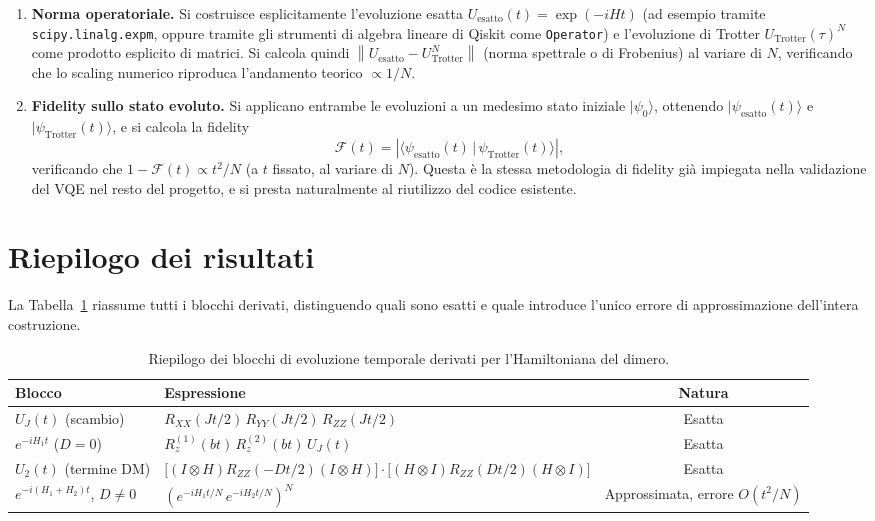 \documentclass[11pt,a4paper]{article}
\newcommand{\ket}[1]{\lvert #1 \rangle}
\begin{document}
\begin{enumerate}
\item \textbf{Norma operatoriale.} Si costruisce esplicitamente l'evoluzione esatta $U_{\text{esatto}}(t)=\exp(-iHt)$ (ad esempio tramite \texttt{scipy.linalg.expm}, oppure tramite gli strumenti di algebra lineare di Qiskit come \texttt{Operator}) e l'evoluzione di Trotter $U_{\text{Trotter}}(\tau)^N$ come prodotto esplicito di matrici. Si calcola quindi $\left\|U_{\text{esatto}}-U_{\text{Trotter}}^N\right\|$ (norma spettrale o di Frobenius) al variare di $N$, verificando che lo scaling numerico riproduca l'andamento teorico $\propto 1/N$.
\item \textbf{Fidelity sullo stato evoluto.} Si applicano entrambe le evoluzioni a un medesimo stato iniziale $\ket{\psi_0}$, ottenendo $\ket{\psi_{\text{esatto}}(t)}$ e $\ket{\psi_{\text{Trotter}}(t)}$, e si calcola la fidelity
\begin{equation}
\mathcal F(t) = \left|\langle \psi_{\text{esatto}}(t) \,|\, \psi_{\text{Trotter}}(t) \rangle\right|,
\end{equation}
verificando che $1-\mathcal F(t) \propto t^2/N$ (a $t$ fissato, al variare di $N$). Questa è la stessa metodologia di fidelity già impiegata nella validazione del VQE nel resto del progetto, e si presta naturalmente al riutilizzo del codice esistente.
\end{enumerate}

\section{Riepilogo dei risultati}

La Tabella~\ref{tab:riepilogo} riassume tutti i blocchi derivati, distinguendo quali sono esatti e quale introduce l'unico errore di approssimazione dell'intera costruzione.

\begin{table}[h]
\centering
\begin{tabular}{@{}p{3.3cm}p{7.7cm}c@{}}
\toprule
\textbf{Blocco} & \textbf{Espressione} & \textbf{Natura} \\
\midrule
$U_J(t)$ (scambio) & $R_{XX}(Jt/2)\,R_{YY}(Jt/2)\,R_{ZZ}(Jt/2)$ & Esatta \\[4pt]
$e^{-iH_1t}$ ($D=0$) & $R_z^{(1)}(bt)\,R_z^{(2)}(bt)\,U_J(t)$ & Esatta \\[4pt]
$U_2(t)$ (termine DM) & $\big[(I\otimes H)R_{ZZ}(-Dt/2)(I\otimes H)\big]\cdot\big[(H\otimes I)R_{ZZ}(Dt/2)(H\otimes I)\big]$ & Esatta \\[4pt]
$e^{-i(H_1+H_2)t}$, $D\neq0$ & $\left(e^{-iH_1t/N}\,e^{-iH_2t/N}\right)^N$ & Approssimata, errore $O(t^2/N)$ \\
\bottomrule
\end{tabular}
\caption{Riepilogo dei blocchi di evoluzione temporale derivati per l'Hamiltoniana del dimero.}
\label{tab:riepilogo}
\end{table}
\end{document}
